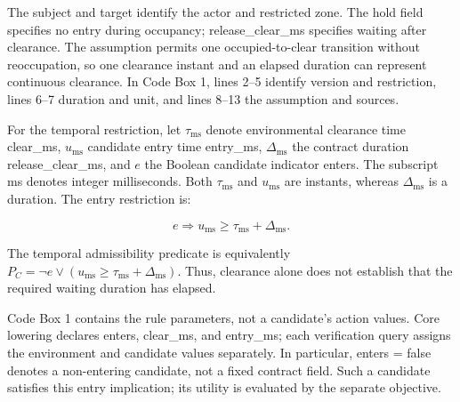 \documentclass[nolineno]{ieeeaccess}
\begin{document}
The {\ttfamily{}\selectfont\footnotesize subject} and {\ttfamily{}\selectfont\footnotesize target} identify the actor and restricted zone. The {\ttfamily{}\selectfont\footnotesize hold} field specifies no entry during occupancy; {\ttfamily{}\selectfont\footnotesize release\_\allowbreak clear\_\allowbreak ms} specifies waiting after clearance. The {\ttfamily{}\selectfont\footnotesize assumption} permits one occupied-to-clear transition without reoccupation, so one clearance instant and an elapsed duration can represent continuous clearance. In Code Box 1, lines 2--5 identify version and restriction, lines 6--7 duration and unit, and lines 8--13 the assumption and sources.\par

For the temporal restriction, let $\tau_{\mathrm{ms}}$ denote environmental clearance time {\ttfamily{}\selectfont\footnotesize clear\_\allowbreak ms}, $u_{\mathrm{ms}}$ candidate entry time {\ttfamily{}\selectfont\footnotesize entry\_\allowbreak ms}, $\Delta_{\mathrm{ms}}$ the contract duration {\ttfamily{}\selectfont\footnotesize release\_\allowbreak clear\_\allowbreak ms}, and $e$ the Boolean candidate indicator {\ttfamily{}\selectfont\footnotesize enters}. The subscript ms denotes integer milliseconds. Both $\tau_{\mathrm{ms}}$ and $u_{\mathrm{ms}}$ are instants, whereas $\Delta_{\mathrm{ms}}$ is a duration. The entry restriction is:\par

\[e\Rightarrow u_{\mathrm{ms}}\geq\tau_{\mathrm{ms}}+\Delta_{\mathrm{ms}}.\]

The temporal admissibility predicate is equivalently $P_C=\neg e\lor(u_{\mathrm{ms}}\geq\tau_{\mathrm{ms}}+\Delta_{\mathrm{ms}})$. Thus, clearance alone does not establish that the required waiting duration has elapsed.\par

Code Box 1 contains the rule parameters, not a candidate's action values. Core lowering declares {\ttfamily{}\selectfont\footnotesize enters}, {\ttfamily{}\selectfont\footnotesize clear\_\allowbreak ms}, and {\ttfamily{}\selectfont\footnotesize entry\_\allowbreak ms}; each verification query assigns the environment and candidate values separately. In particular, {\ttfamily{}\selectfont\footnotesize enters = false} denotes a non-entering candidate, not a fixed contract field. Such a candidate satisfies this entry implication; its utility is evaluated by the separate objective.\par
\end{document}
